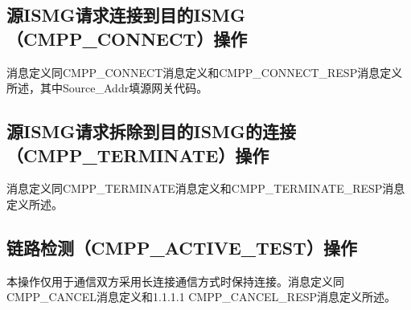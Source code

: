 \documentclass[11pt]{book} %
\begin{document}
\subsection{源ISMG请求连接到目的ISMG（CMPP\_CONNECT）操作}

消息定义同CMPP\_CONNECT消息定义和CMPP\_CONNECT\_RESP消息定义所述，其中Source\_Addr填源网关代码。
%
%
%
%
%



\subsection{源ISMG请求拆除到目的ISMG的连接（CMPP\_TERMINATE）操作}


消息定义同CMPP\_TERMINATE消息定义和CMPP­\_TERMINATE\_RESP消息定义所述。
%
%
%
%
%




\subsection{链路检测（CMPP\_ACTIVE\_TEST）操作}

本操作仅用于通信双方采用长连接通信方式时保持连接。消息定义同CMPP\_CANCEL消息定义和1.1.1.1  CMPP\_CANCEL\_RESP消息定义所述。


%
%
%
%
%
\end{document}
